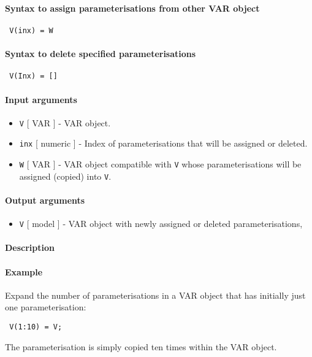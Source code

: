 


	\paragraph{Syntax to assign parameterisations from other VAR object}
 
 \begin{verbatim}
 V(inx) = W
 \end{verbatim}
 
 \paragraph{Syntax to delete specified parameterisations}
 
 \begin{verbatim}
 V(Inx) = []
 \end{verbatim}
 
 \paragraph{Input arguments}
 
 \begin{itemize}
 \item
   \texttt{V} {[} VAR {]} - VAR object.
 \item
   \texttt{inx} {[} numeric {]} - Index of parameterisations that will be
   assigned or deleted.
 \item
   \texttt{W} {[} VAR {]} - VAR object compatible with \texttt{V} whose
   parameterisations will be assigned (copied) into \texttt{V}.
 \end{itemize}
 
 \paragraph{Output arguments}
 
 \begin{itemize}
 \item
   \texttt{V} {[} model {]} - VAR object with newly assigned or deleted
   parameterisations,
 \end{itemize}
 
 \paragraph{Description}
 
 \paragraph{Example}
 
 Expand the number of parameterisations in a VAR object that has
 initially just one parameterisation:
 
 \begin{verbatim}
 V(1:10) = V;
 \end{verbatim}
 
 The parameterisation is simply copied ten times within the VAR object.


